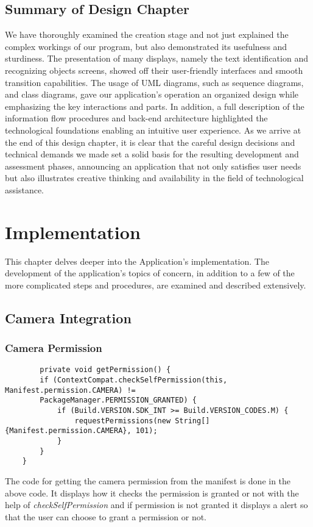 \documentclass[MScCS]{uccthesis}
\begin{document}
\section{Summary of Design Chapter}
We have thoroughly examined the creation stage and not just explained the complex workings of our program, but also demonstrated its usefulness and sturdiness. The presentation of many displays, namely the text identification and recognizing objects screens, showed off their user-friendly interfaces and smooth transition capabilities. The usage of UML diagrams, such as sequence diagrams, and class diagrams, gave our application's operation an organized design while emphasizing the key interactions and parts. In addition, a full description of the information flow procedures and back-end architecture highlighted the technological foundations enabling an intuitive user experience. As we arrive at the end of this design chapter, it is clear that the careful design decisions and technical demands we made set a solid basis for the resulting development and assessment phases, announcing an application that not only satisfies user needs but also illustrates creative thinking and availability in the field of technological assistance.



\chapter{Implementation}

This chapter delves deeper into the Application's implementation. The development of the application's topics of concern, in addition to a few of the more complicated steps and procedures, are examined and described extensively.

\section{Camera Integration}
\subsection{Camera Permission}
\begin{scriptsize}
    \begin{verbatim}
        private void getPermission() {
        if (ContextCompat.checkSelfPermission(this, Manifest.permission.CAMERA) != 
        PackageManager.PERMISSION_GRANTED) {
            if (Build.VERSION.SDK_INT >= Build.VERSION_CODES.M) {
                requestPermissions(new String[]{Manifest.permission.CAMERA}, 101);
            }
        }
    }
    \end{verbatim}
\end{scriptsize}
The code for getting the camera permission from the manifest is done in the above code. It displays how it checks the permission is granted or not with the help of \textit{checkSelfPermission} and if permission is not granted it displays a alert so that the user can choose to grant a permission or not.
\end{document}
